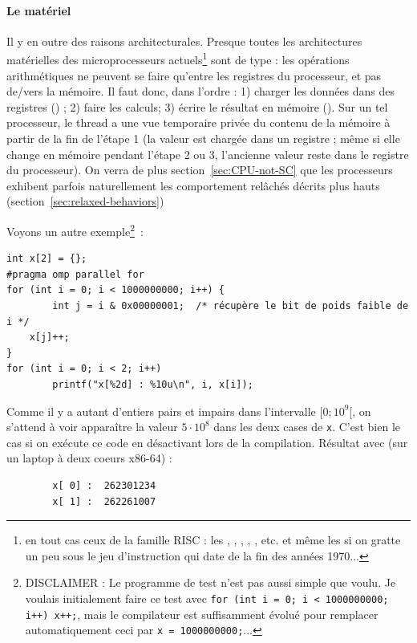\paragraph{Le matériel} Il y en outre des raisons architecturales. Presque
toutes les architectures matérielles des microprocesseurs actuels\footnote{en
  tout cas ceux de la famille RISC : les , ,
  , , , etc. et même les
   si on gratte un peu sous le jeu d'instruction qui date de la
  fin des années 1970...} sont de type  : les opérations
arithmétiques ne peuvent se faire qu'entre les registres du processeur, et pas
de/vers la mémoire. Il faut donc, dans l'ordre : 1) charger les données dans des
registres () ; 2) faire les calculs; 3) écrire le résultat en
mémoire (). Sur un tel processeur, le thread a une \og vue temporaire privée\fg{}
du contenu de la mémoire à partir de la fin de l'étape 1 (la valeur est chargée
dans un registre ; même si elle change en mémoire pendant l'étape 2 ou 3,
l'ancienne valeur reste dans le registre du processeur). On verra de plus section~\ref{sec:CPU-not-SC}
que les processeurs exhibent parfois naturellement les comportement relâchés décrits plus hauts (section~\ref{sec:relaxed-behaviors})

Voyons un autre exemple\footnote{DISCLAIMER : Le programme de test
  n'est pas aussi simple que voulu. Je voulais initialement faire ce test avec
  \texttt{for (int i = 0; i < 1000000000; i++) x++;}, mais le compilateur
   est suffisamment évolué pour remplacer automatiquement ceci
  par \texttt{x = 1000000000;}...}~:
\begin{myfilet}
\begin{verbatim}
int x[2] = {};
#pragma omp parallel for
for (int i = 0; i < 1000000000; i++) {
        int j = i & 0x00000001;  /* récupère le bit de poids faible de i */
	x[j]++;	
}
for (int i = 0; i < 2; i++)
        printf("x[%2d] : %10u\n", i, x[i]);
\end{verbatim}
\end{myfilet}

Comme il y a autant d'entiers pairs et impairs dans l'intervalle $[0; 10^9[$, on
s'attend à voir apparaître la valeur $5 \cdot 10^8$ dans les deux cases de
\texttt{x}. C'est bien le cas si on exécute ce code en désactivant \OMP lors de
la compilation. Résultat avec \OMP (sur un laptop à deux coeurs x86-64) :
\begin{verbatim}
        x[ 0] :  262301234
        x[ 1] :  262261007
\end{verbatim}

